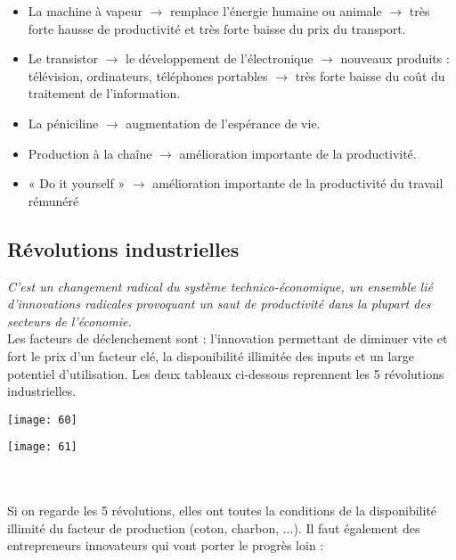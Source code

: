 \begin{itemize}
	\item La machine à vapeur $\rightarrow$ remplace l’énergie humaine ou animale $\rightarrow$ très forte hausse de productivité et très forte baisse du prix du transport.
	      	
	\item Le transistor $\rightarrow$ le développement de l’électronique $\rightarrow$ nouveaux produits : télévision, ordinateurs, téléphones portables $\rightarrow$ très forte baisse du coût du traitement de l’information.
	      	
	\item La péniciline $\rightarrow$ augmentation de l'espérance de vie.
	      	
	\item Production à la chaîne $\rightarrow$ amélioration importante de la productivité.
	      	
	\item « Do it yourself » $\rightarrow$ amélioration importante de la productivité du travail rémunéré
\end{itemize}

\subsection{Révolutions industrielles}
\textit{C'est un changement radical du système technico-économique, un ensemble lié d’innovations radicales provoquant un saut de productivité dans la plupart des secteurs
	de l’économie.} \\
Les facteurs de déclenchement sont : l'innovation permettant de diminuer vite et fort le prix d'un facteur clé, la disponibilité illimitée des inputs et un large  potentiel d'utilisation. Les deux tableaux ci-dessous reprennent les 5 révolutions industrielles. \\

\begin{minipage}{0.5\textwidth}
	\begin{flushleft}
		\texttt{[image: 60]}
	\end{flushleft}
\end{minipage}
\begin{minipage}{0.5\textwidth}
	\begin{center}
		\texttt{[image: 61]}
	\end{center}
\end{minipage}
\\\\
Si on regarde les 5 révolutions, elles ont toutes la conditions de la disponibilité illimité du facteur de production (coton, charbon, ...). Il faut également des entrepreneurs innovateurs qui vont porter le progrès loin : 

